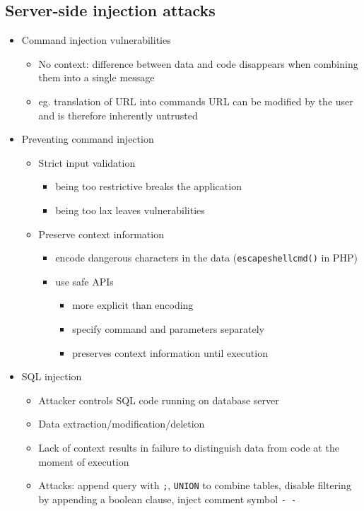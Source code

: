\documentclass[12pt,titlepage,a4paper]{report}
\begin{document}
			\subsection{Server-side injection attacks}
			\begin{itemize}
				\item Command injection vulnerabilities
				\begin{itemize}
					\item No context: difference between data and code disappears when combining them into a single message
					\item eg. translation of URL into commands
						\subitem URL can be modified by the user and is therefore inherently untrusted
				\end{itemize}
			
				\item Preventing command injection
				\begin{itemize}
					\item Strict input validation
					\begin{itemize}
						\item being too restrictive breaks the application
						\item being too lax leaves vulnerabilities
					\end{itemize}
					\item Preserve context information
					\begin{itemize}
						\item encode dangerous characters in the data (\texttt{escapeshellcmd()} in PHP)
						\item use safe APIs
						\begin{itemize}
							\item more explicit than encoding
							\item specify command and parameters separately
							\item preserves context information until execution
						\end{itemize}
					\end{itemize}
				\end{itemize}
			
				\item SQL injection
				\begin{itemize}
					\item Attacker controls SQL code running on database server
					\item Data extraction/modification/deletion
					\item Lack of context results in failure to distinguish data from code at the moment of execution
					\item Attacks: append query with \texttt{;}, \texttt{UNION} to combine tables, disable filtering by appending a boolean clause, inject comment symbol \texttt{-\,-}
				\end{itemize}


\end{itemize}
\end{document}
